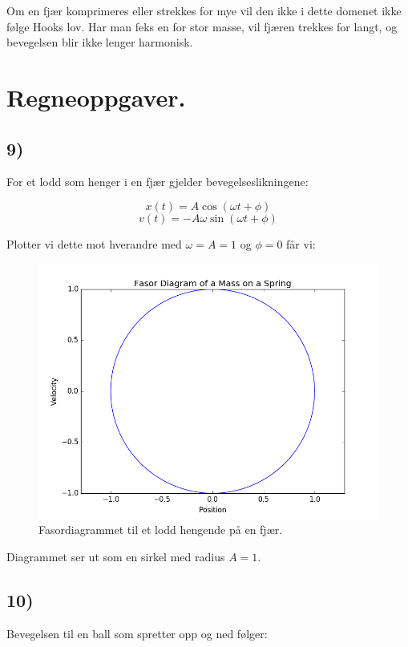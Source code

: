 \documentclass[a4paper,norsk, 10pt]{article}
\begin{document}
Om en fjær komprimeres eller strekkes for mye vil den ikke i dette domenet ikke følge Hooks lov. Har man feks en for stor masse, vil fjæren trekkes for langt, og bevegelsen blir ikke lenger harmonisk.

\newpage

\section*{Regneoppgaver.}
\subsection*{9)}

For et lodd som henger i en fjær gjelder bevegelseslikningene:

$$
x(t) = A\cos(\omega t + \phi)
$$
$$
v(t) = -A\omega \sin(\omega t + \phi)
$$

Plotter vi dette mot hverandre med $\omega = A = 1$ og $\phi = 0$ får vi:

\begin{figure}[H]
\centering

\includegraphics[scale=0.5]{springFasor.png}
\caption{Fasordiagrammet til et lodd hengende på en fjær.}
\end{figure}

Diagrammet ser ut som en sirkel med radius $A = 1$. 


\subsection*{10)}
Bevegelsen til en ball som spretter opp og ned følger:
\end{document}

